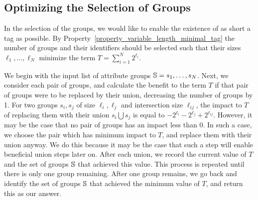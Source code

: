 \subsection{Optimizing the Selection of Groups}
In the selection of the groups, we would like to enable the existence
of as short a tag as possible. By Property~\ref{property_variable_length_minimal_tag} the number of groups and their identifiers should be selected such that their sizes $\ell_1, \ldots, \ell_N$ minimize the term $T = \sum_{i = 1}^{N}{2^{\ell_i}}$. 

We begin with the input list of attribute groups $\mathbb{S} = s_1, \ldots, s_N$.
Next,  we consider each pair of groups, and calculate the benefit to the term $T$ if that pair of groups were to be replaced by their union, decreasing the number of groups by 1. For two groups $s_i, s_j$ of 
size $\ell_i, \ell_j$ and intersection size $\ell_{ij}$, the impact to $T$ of replacing them with their union $s_i \bigcup s_j$ is equal to $-2^{\ell_i} - 2^{\ell_j} + 2^{\ell_{ij}}$. However, it may be the case that no pair of groups has an impact less than 0. In such a case, we choose the pair which has minimum impact to $T$, and replace them with their union anyway. We do this because it may be the case that such a step will enable beneficial union steps later on. After each union, we record the current value of $T$ and the set of groups $\mathbb{S}$ that achieved this value. This process is repeated until there is only one group remaining. 
After one group remains, we go back and identify the set of groups $\mathbb{S}$ that achieved the minimum value of $T$, and return this as our answer.